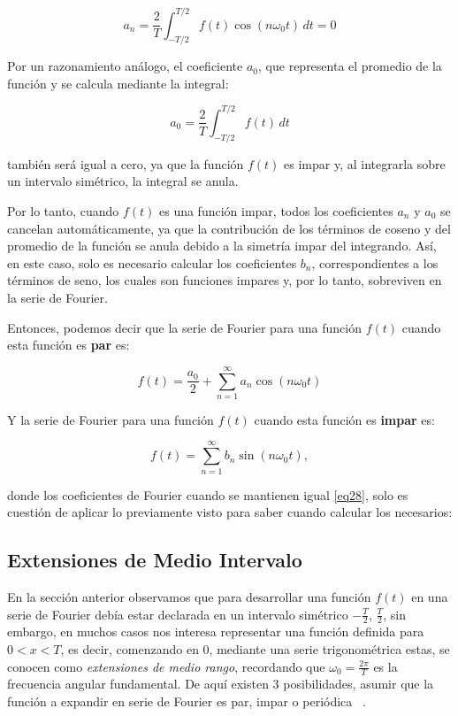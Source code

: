 \[
a_n = \frac{2}{T} \int_{-T/2}^{T/2} f(t) \cos(n \omega_0 t) \, dt = 0
\]

Por un razonamiento análogo, el coeficiente \( a_0 \), que representa el promedio de la función y se calcula mediante la integral:

\[
a_0 = \frac{2}{T} \int_{-T/2}^{T/2} f(t) \, dt
\]

también será igual a cero, ya que la función \( f(t) \) es impar y, al integrarla sobre un intervalo simétrico, la integral se anula.

Por lo tanto, cuando \( f(t) \) es una función impar, todos los coeficientes \( a_n \) y \( a_0 \) se cancelan automáticamente, ya que la contribución de los términos de coseno y del promedio de la función se anula debido a la simetría impar del integrando. Así, en este caso, solo es necesario calcular los coeficientes \( b_n \), correspondientes a los términos de seno, los cuales son funciones impares y, por lo tanto, sobreviven en la serie de Fourier. \newline

Entonces, podemos decir que la serie de Fourier para una función $f(t)$ cuando esta función es \textbf{par} es:

\begin{equation}\label{eq30}
	f(t) = \frac{a_0}{2} + \sum_{n=1}^{\infty} a_n \cos(n\omega_0 t)
\end{equation}

Y la serie de Fourier para una función $f(t)$ cuando esta función es \textbf{impar} es:

\begin{equation}\label{eq31}
	f(t) =\sum_{n=1}^{\infty}  b_n \sin(n\omega_0 t),
\end{equation}

donde los coeficientes de Fourier cuando se mantienen igual \ref{eq28}, solo es cuestión de aplicar lo previamente visto para saber cuando calcular los necesarios:


\subsection{Extensiones de Medio Intervalo}
En la sección anterior observamos que para desarrollar una función $f(t)$ en una serie de Fourier debía estar declarada en un intervalo simétrico $-\frac{T}{2}$, $\frac{T}{2}$, sin embargo, en muchos casos nos interesa representar una función definida para $0 < x < T$, es decir, comenzando en 0, mediante una serie trigonométrica estas, se conocen como \textit{extensiones de medio rango}, recordando que  $\omega_0 = \frac{2\pi}{T}$ es la frecuencia angular fundamental. De aquí existen 3 posibilidades, asumir que la función a expandir en serie de Fourier es par, impar o periódica ~\cite{fourierCruzFierro}. 

